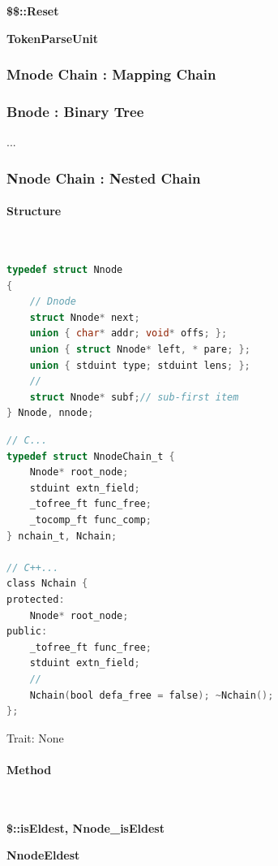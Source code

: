 \textbf{\$\$::Reset}

\textbf{TokenParseUnit}



\subsubsection{Mnode Chain : Mapping Chain}



\subsubsection{Bnode : Binary Tree}

...



\subsubsection{Nnode Chain : Nested Chain}



\paragraph{Structure} \

\begin{lstlisting}[language=C]
typedef struct Nnode
{
	// Dnode
	struct Nnode* next;
	union { char* addr; void* offs; };
	union { struct Nnode* left, * pare; };
	union { stduint type; stduint lens; };
	//
	struct Nnode* subf;// sub-first item
} Nnode, nnode;
\end{lstlisting}

\begin{lstlisting}[language=C]
// C...
typedef struct NnodeChain_t {
	Nnode* root_node;
	stduint extn_field;
	_tofree_ft func_free;
	_tocomp_ft func_comp;
} nchain_t, Nchain;

// C++...
class Nchain {
protected:
	Nnode* root_node;
public:
	_tofree_ft func_free;
	stduint extn_field;
	//
	Nchain(bool defa_free = false); ~Nchain();
};
\end{lstlisting}

Trait: None



\paragraph{Method} \

\textbf{\$::isEldest, Nnode\_isEldest}

\textbf{NnodeEldest}

